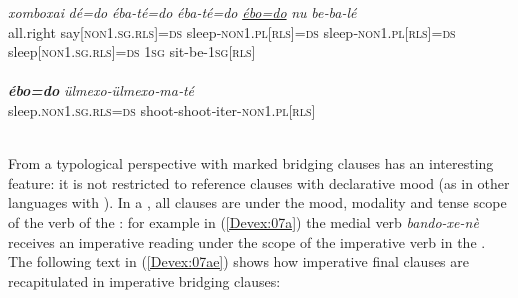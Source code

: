 \documentclass[output=paper]{LSP/langsci}
\begin{document}
\begin{exe}
\ex \label{Devex:06ab}
\begin{xlist}
\ex \label{Devex:06a}			
\gll \textit{xomboxai} \textit{dé=do} \textit{éba-té=do} \textit{éba-té=do} \textit{\underline{ébo=do}} \textit{nu} \textit{be‑ba‑lé}\\     all.right say[\textsc{non1.sg.rls}]=\textsc{ds} sleep‑\textsc{non1.pl[rls]=ds}  		sleep‑\textsc{non1.pl[rls]=ds} sleep[\textsc{non1.sg.rls}]=\textsc{ds} \textsc{1sg} sit-be-\textsc{1sg[rls]}\\ 
\glt {}\\ 
\ex \label{Devex:06b}			
\gll \textbf{\textit{ébo=do}} \textit{ülmexo‑ülmexo‑ma‑té}\\
sleep.\textsc{non1.sg.rls=ds} shoot‑shoot‑iter-\textsc{non1.pl[rls]}\\ 
\glt {}\\
\end{xlist}
\end{exe}

From a typological perspective   with  marked bridging clauses has an interesting feature: it is not restricted to reference clauses with declarative mood (as in other languages with ). In a , all clauses are under the mood, modality and tense scope of the verb of the : for example in (\ref{Devex:07a}) the medial verb \textit{bando-xe-nè} receives an imperative reading under the scope of the imperative verb in the . The following text in (\ref{Devex:07ae}) shows how imperative final clauses are recapitulated in imperative bridging clauses:
\end{document}
